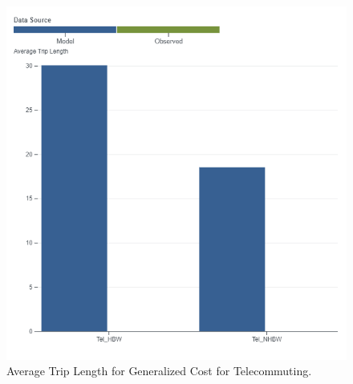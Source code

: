\documentclass[
  letterpaper,
  DIV=11,
  numbers=noendperiod]{scrreprt}
\begin{document}
\begin{figure}[H]

{\centering \includegraphics[width=\textwidth,height=0.4\textheight]{v9x/v900/validation/_pictures/5-plot3.png}

}

\caption{\label{fig-pdf-cg-tele}Average Trip Length for Generalized Cost
for Telecommuting.}

\end{figure}
\end{document}
